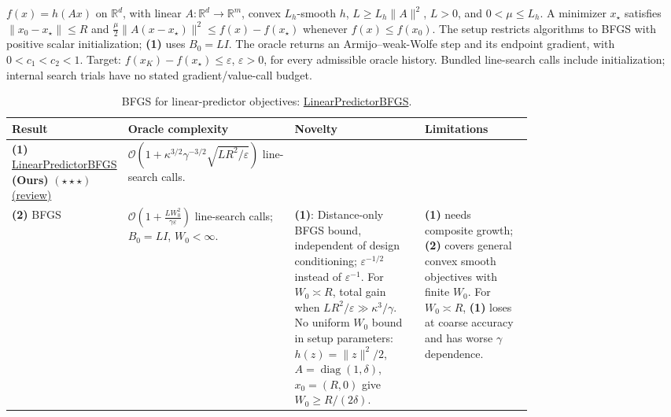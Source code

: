 \begin{table}[tp]
\centering
\caption{BFGS for linear-predictor objectives: \href{https://github.com/k3nfalt/longtails/blob/main/LongTails/Setups/LinearPredictorBFGS.lean}{LinearPredictorBFGS}.}\label{tab:LinearPredictorBFGS}
\parbox{\linewidth}{\footnotesize $f(x)=h(Ax)$ on $\mathbb{R}^d$, with linear $A:\mathbb{R}^d\to\mathbb{R}^m$, convex $L_h$-smooth $h$, $L\ge L_h\|A\|^2$, $L>0$, and $0<\mu\le L_h$. A minimizer $x_\star$ satisfies $\|x_0-x_\star\|\le R$ and $\frac{\mu}{2}\|A(x-x_\star)\|^2\le f(x)-f(x_\star)$ whenever $f(x)\le f(x_0)$. The setup restricts algorithms to BFGS with positive scalar initialization; \textbf{(1)} uses $B_0=LI$. The oracle returns an Armijo--weak-Wolfe step and its endpoint gradient, with $0<c_1<c_2<1$. Target: $f(x_K)-f(x_\star)\le\varepsilon$, $\varepsilon>0$, for every admissible oracle history. Bundled line-search calls include initialization; internal search trials have no stated gradient/value-call budget.}\par\smallskip
\begin{threeparttable}
\footnotesize
\setlength{\tabcolsep}{4pt}\renewcommand{\arraystretch}{1.25}
\begin{tabularx}{\linewidth}{@{}>{\raggedright\arraybackslash}p{0.20\linewidth}>{\raggedright\arraybackslash}p{0.32\linewidth}>{\raggedright\arraybackslash}p{0.25\linewidth}>{\raggedright\arraybackslash}X@{}}
\toprule
\textbf{Result} & \textbf{Oracle complexity} & \textbf{Novelty} & \textbf{Limitations} \\
\midrule
\textbf{(1)} \href{https://github.com/k3nfalt/longtails/blob/main/LongTails/Theorems/LinearPredictorBFGS.lean}{Linear\allowbreak{}Predictor\allowbreak{}BFGS} \textbf{(Ours)} $(\star\star\star)$ \href{https://github.com/k3nfalt/longtails/blob/main/scripts/reviews/LinearPredictorBFGS.md}{(review)}
& $\mathcal{O}\!\left(1+\kappa^{3/2}\gamma^{-3/2}\sqrt{LR^2/\varepsilon}\right)$ line-search calls.
& & \\
\midrule[1.2pt]
\textbf{(2)} BFGS \citep[Thm.~3.1, Eq.~(11)]{lpbDingYangZhou2026v1}
& $\mathcal{O}\!\left(1+\frac{LW_0^2}{\gamma\varepsilon}\right)$ line-search calls; $B_0=LI$, $W_0<\infty$.
& \textbf{(1)}: Distance-only BFGS bound, independent of design conditioning; $\varepsilon^{-1/2}$ instead of $\varepsilon^{-1}$. For $W_0\asymp R$, total gain when $LR^2/\varepsilon\gg\kappa^3/\gamma$. No uniform $W_0$ bound in setup parameters: $h(z)=\|z\|^2/2$, $A=\operatorname{diag}(1,\delta)$, $x_0=(R,0)$ give $W_0\ge R/(2\delta)$.
& \textbf{(1)} needs composite growth; \textbf{(2)} covers general convex smooth objectives with finite $W_0$. For $W_0\asymp R$, \textbf{(1)} loses at coarse accuracy and has worse $\gamma$ dependence. \\

\end{tabularx}
\end{threeparttable}
\end{table}
